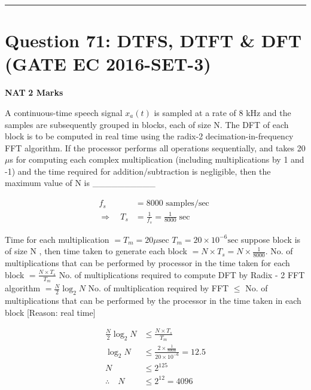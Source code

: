\documentclass[11pt,a4paper]{article}
\begin{document}
\vspace{1.5em}
\hrule
\vspace{1.5em}

\section*{Question 71: DTFS, DTFT \& DFT (GATE EC 2016-SET-3)}
\noindent \textbf{\color{primary}NAT} \hfill \textbf{\color{secondary}2 Marks}


\noindent A continuous-time speech signal $x_{a}(t)$ is sampled at a rate of 8 kHz and the samples are subsequently grouped in blocks, each of size N. The DFT of each block is to be computed in real time using the radix-2 decimation-in-frequency FFT algorithm. If the processor performs all operations sequentially, and takes 20 $\mu$s for computing each complex multiplication (including multiplications by 1 and -1) and the time required for addition/subtraction is negligible, then the maximum value of N is \_\_\_\_\_\_\_\_\_\_


\begin{tcolorbox}[solbox, title=Detailed Solution -- Question 71]
\[
\begin{aligned} f_{s} &=8000 \text { samples/sec } \\ \Rightarrow \quad T_{s} &=\frac{1}{f_{s}}=\frac{1}{8000} \sec \end{aligned}
\]

 Time for each multiplication $=T_{m}=20 \mu \mathrm{sec}$
$T_{m}=20 \times 10^{-6} \mathrm{sec}$
suppose block is of size N , then time taken to generate each block $=N \times T_{s}=N \times \frac{1}{8000}.$
 No.  of multiplications that can be performed by processor in the time taken for each block $=\frac{N \times T_{s}}{T_{m}}$
 No. of multiplications required to compute DFT by Radix - 2 FFT algorithm $=\frac{N}{2} \log _{2} N$
 No. of multiplication required by FFT $\leq$ No. of multiplications that can be performed by the processor in the time taken in each block 
 [Reason: real time]

\[
\begin{aligned} \frac{N}{2} \log _{2} N & \leq \frac{N \times T_{s}}{T_{m}} \\ \log _{2} N & \leq \frac{2 \times \frac{1}{8000}}{20 \times 10^{-6}}=12.5 \\ N & \leq 2^{125} \\ \therefore \quad N & \leq 2^{12}=4096 \end{aligned}
\]
\end{tcolorbox}
\end{document}
